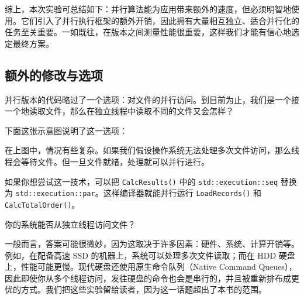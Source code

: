 综上，本次实验可总结如下：并行算法能为应用带来额外的速度，但必须明智地使用。它们引入了并行执行框架的额外开销，因此拥有大量相互独立、适合并行化的任务至关重要。一如既往，在版本之间测量性能很重要，这样我们才能有信心地选定最终方案。

\subsection{额外的修改与选项}

并行版本的代码略过了一个选项：对文件的并行访问。到目前为止，我们是一个接一个地读取文件，那么在独立线程中读取不同的文件又会怎样？

下面这张示意图说明了这一选项：


在上图中，情况有些复杂。如果我们假设操作系统无法处理多次文件访问，那么线程会等待文件。但一旦文件就绪，处理就可以并行进行。

如果你想尝试这一技术，可以把 \texttt{CalcResults()} 中的 \texttt{std::execution::seq} 替换为 \texttt{std::execution::par}。这样编译器就能并行运行 \texttt{LoadRecords()} 和 \texttt{CalcTotalOrder()}。

你的系统能否从独立线程访问文件？

一般而言，答案可能很微妙，因为这取决于许多因素：硬件、系统、计算开销等。例如，在配备高速 SSD 的机器上，系统可以处理多次文件读取；而在 HDD 硬盘上，性能可能更慢。现代硬盘还使用原生命令队列（Native Command Queues），因此即使你从多个线程访问，发往硬盘的命令也会是串行的，并且被重新排布成更优的方式。我们把这些实验留给读者，因为这一话题超出了本书的范围。
